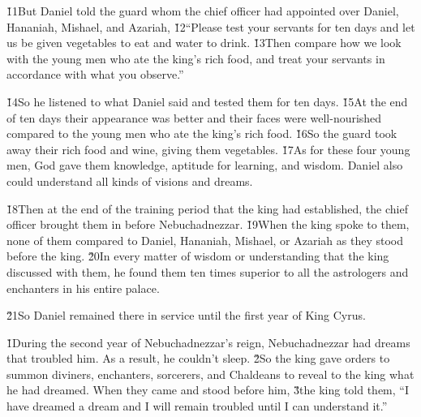 \v{11}But Daniel told the guard whom the chief officer had appointed over Daniel, Hananiah, Mishael, and Azariah, \v{12}``Please test your servants for ten days and let us be given vegetables to eat and water to drink. \v{13}Then compare how we look with the young men who ate the king's rich food, and treat your servants in accordance with what you observe.''

\v{14}So he listened to what Daniel said and tested them for ten days. \v{15}At the end of ten days their appearance was better and their faces were well-nourished compared to the young men who ate the king's rich food. \v{16}So the guard took away their rich food and wine, giving them vegetables. \v{17}As for these four young men, God gave them knowledge, aptitude for learning, and wisdom. Daniel also could understand all kinds of visions and dreams.

\v{18}Then at the end of the training period that the king had established, the chief officer brought them in before Nebuchadnezzar. \v{19}When the king spoke to them, none of them compared to Daniel, Hananiah, Mishael, or Azariah as they stood before the king. \v{20}In every matter of wisdom or understanding that the king discussed with them, he found them ten times superior to all the astrologers and enchanters in his entire palace.

\v{21}So Daniel remained there in service until the first year of King Cyrus.

\v{1}During the second year of Nebuchadnezzar's reign, Nebuchadnezzar had dreams that troubled him. As a result, he couldn't sleep. \v{2}So the king gave orders to summon diviners, enchanters, sorcerers, and Chaldeans to reveal to the king what he had dreamed. When they came and stood before him, \v{3}the king told them, ``I have dreamed a dream and I will remain troubled until I can understand it.''

